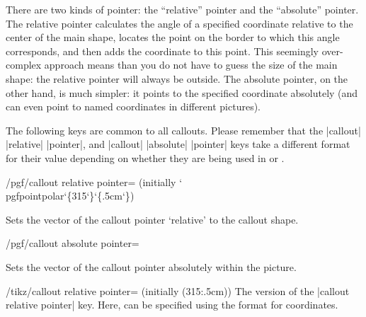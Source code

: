 There are two kinds of pointer:	the ``relative'' pointer and the
``absolute'' pointer.	The relative pointer calculates the angle of a
specified coordinate relative to the center of the main shape, locates
the point on the border to which this angle corresponds, and then adds
the coordinate to this point. This seemingly over-complex approach
means than you do not have to guess the size of the main shape: the
relative pointer will always be outside.
The absolute pointer, on the
other hand, is much simpler: it points to the specified coordinate
absolutely (and can even point to named coordinates in different
pictures).


\begin{codeexample}[]
\end{codeexample}


The following keys are common to all callouts. Please remember
that the |callout| |relative| |pointer|, and |callout| |absolute|
|pointer| keys take a different format for their value depending
on whether they are being used in \pgfname{} or \tikzname{}.


\begin{key}{/pgf/callout relative pointer= (initially {\ttfamily\char`\\pgfpointpolar\char`\{315\char`\}\char`\{.5cm\char`\}})}

  Sets the vector of the callout pointer `relative' to the callout
  shape.

\end{key}

\begin{key}{/pgf/callout absolute pointer=}

  Sets the vector of the callout pointer absolutely within the picture.

\end{key}



\begin{key}{/tikz/callout relative pointer= (initially {(315:.5cm)})}
	The \tikzname{} version of the |callout relative pointer| key. Here,
	 can be specified using the \tikzname{} format for
	coordinates.
\end{key}

